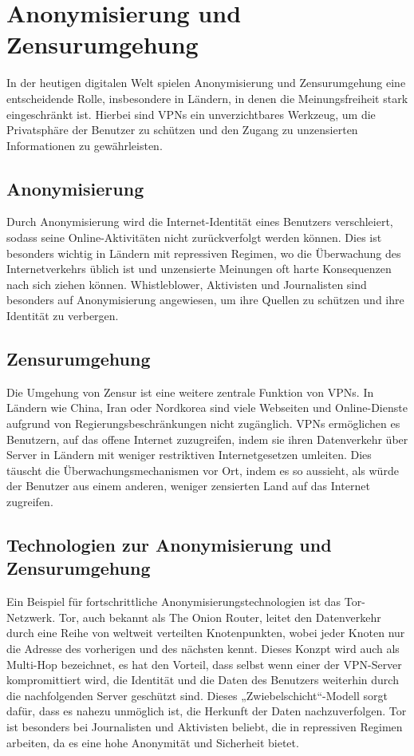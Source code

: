 \section{Anonymisierung und Zensurumgehung} \label{ano-zensur}
In der heutigen digitalen Welt spielen Anonymisierung und Zensurumgehung eine entscheidende Rolle, insbesondere in Ländern, in denen die Meinungsfreiheit stark eingeschränkt ist. Hierbei sind \gls{VPN}s ein unverzichtbares Werkzeug, um die Privatsphäre der Benutzer zu schützen und den Zugang zu unzensierten Informationen zu gewährleisten. 

\subsection{Anonymisierung}
Durch Anonymisierung wird die Internet-Identität eines Benutzers verschleiert, sodass seine Online-Aktivitäten nicht zurückverfolgt werden können. Dies ist besonders wichtig in Ländern mit repressiven Regimen, wo die Überwachung des Internetverkehrs üblich ist und unzensierte Meinungen oft harte Konsequenzen nach sich ziehen können. Whistleblower, Aktivisten und Journalisten sind besonders auf Anonymisierung angewiesen, um ihre Quellen zu schützen und ihre Identität zu verbergen.

\subsection{Zensurumgehung}
Die Umgehung von Zensur ist eine weitere zentrale Funktion von \gls{VPN}s. In Ländern wie China, Iran oder Nordkorea sind viele Webseiten und Online-Dienste aufgrund von Regierungsbeschränkungen nicht zugänglich. \gls{VPN}s ermöglichen es Benutzern, auf das offene Internet zuzugreifen, indem sie ihren Datenverkehr über Server in Ländern mit weniger restriktiven Internetgesetzen umleiten. Dies täuscht die Überwachungsmechanismen vor Ort, indem es so aussieht, als würde der Benutzer aus einem anderen, weniger zensierten Land auf das Internet zugreifen.

\subsection{Technologien zur Anonymisierung und Zensurumgehung}
Ein Beispiel für fortschrittliche Anonymisierungstechnologien ist das Tor-Netzwerk. Tor, auch bekannt als The Onion Router, leitet den Datenverkehr durch eine Reihe von weltweit verteilten Knotenpunkten, wobei jeder Knoten nur die Adresse des vorherigen und des nächsten kennt. Dieses Konzpt wird auch als Multi-Hop bezeichnet, es hat den Vorteil, dass selbst wenn einer der \gls{VPN}-Server kompromittiert wird, die Identität und die Daten des Benutzers weiterhin durch die nachfolgenden Server geschützt sind. Dieses „Zwiebelschicht“-Modell sorgt dafür, dass es nahezu unmöglich ist, die Herkunft der Daten nachzuverfolgen. Tor ist besonders bei Journalisten und Aktivisten beliebt, die in repressiven Regimen arbeiten, da es eine hohe Anonymität und Sicherheit bietet.

